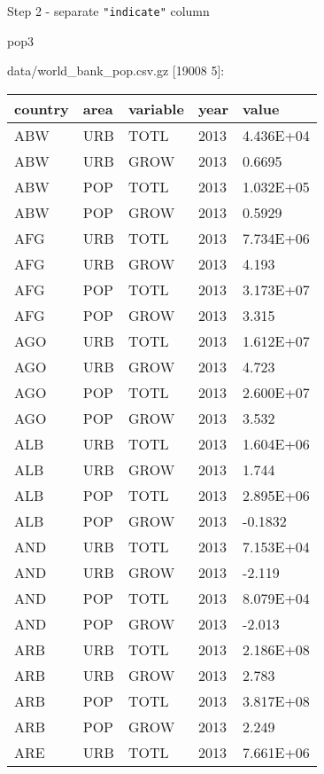 \documentclass[]{article}
\newenvironment{Shaded}{\begin{snugshade}}{\end{snugshade}}
\newcommand{\KeywordTok}[1]{\textcolor[rgb]{0.13,0.29,0.53}{\textbf{#1}}}
\newcommand{\StringTok}[1]{\textcolor[rgb]{0.31,0.60,0.02}{#1}}
\newcommand{\SpecialStringTok}[1]{\textcolor[rgb]{0.31,0.60,0.02}{#1}}
\newcommand{\FunctionTok}[1]{\textcolor[rgb]{0.00,0.00,0.00}{#1}}
\newcommand{\VariableTok}[1]{\textcolor[rgb]{0.00,0.00,0.00}{#1}}
\newcommand{\BuiltInTok}[1]{#1}
\newcommand{\NormalTok}[1]{#1}
\begin{document}
Step 2 - separate \texttt{"indicate"} column

\begin{Shaded}
\end{Shaded}

\begin{Shaded}
\begin{Highlighting}[]
\NormalTok{pop3}
\end{Highlighting}
\end{Shaded}

data/world\_bank\_pop.csv.gz {[}19008 5{]}:

\begin{longtable}[]{@{}lllll@{}}
\toprule
country & area & variable & year & value\tabularnewline
\midrule
\endhead
ABW & URB & TOTL & 2013 & 4.436E+04\tabularnewline
ABW & URB & GROW & 2013 & 0.6695\tabularnewline
ABW & POP & TOTL & 2013 & 1.032E+05\tabularnewline
ABW & POP & GROW & 2013 & 0.5929\tabularnewline
AFG & URB & TOTL & 2013 & 7.734E+06\tabularnewline
AFG & URB & GROW & 2013 & 4.193\tabularnewline
AFG & POP & TOTL & 2013 & 3.173E+07\tabularnewline
AFG & POP & GROW & 2013 & 3.315\tabularnewline
AGO & URB & TOTL & 2013 & 1.612E+07\tabularnewline
AGO & URB & GROW & 2013 & 4.723\tabularnewline
AGO & POP & TOTL & 2013 & 2.600E+07\tabularnewline
AGO & POP & GROW & 2013 & 3.532\tabularnewline
ALB & URB & TOTL & 2013 & 1.604E+06\tabularnewline
ALB & URB & GROW & 2013 & 1.744\tabularnewline
ALB & POP & TOTL & 2013 & 2.895E+06\tabularnewline
ALB & POP & GROW & 2013 & -0.1832\tabularnewline
AND & URB & TOTL & 2013 & 7.153E+04\tabularnewline
AND & URB & GROW & 2013 & -2.119\tabularnewline
AND & POP & TOTL & 2013 & 8.079E+04\tabularnewline
AND & POP & GROW & 2013 & -2.013\tabularnewline
ARB & URB & TOTL & 2013 & 2.186E+08\tabularnewline
ARB & URB & GROW & 2013 & 2.783\tabularnewline
ARB & POP & TOTL & 2013 & 3.817E+08\tabularnewline
ARB & POP & GROW & 2013 & 2.249\tabularnewline
ARE & URB & TOTL & 2013 & 7.661E+06\tabularnewline
\bottomrule
\end{longtable}
\end{document}
